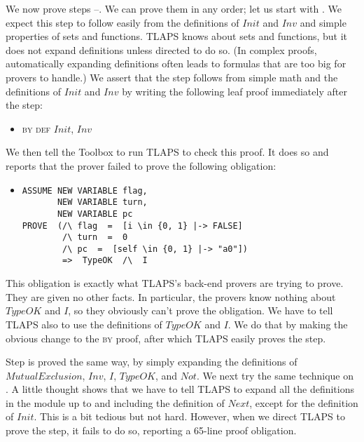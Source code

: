 \documentclass[a4paper]{llncs}
\makeatletter
\newcommand{\step}[2]{{\tlatex \@pfstepnum{#1}{#2}}}
\newenvironment{display}{\begin{itemize}\item[]}{\end{itemize}}
\makeatother
\begin{document}
We now prove steps \step{1}{1}--\step{1}{3}.  We can prove them in any
order; let us start with \step{1}{1}.  We expect this step to follow
easily from the definitions of $Init$ and $Inv$ and simple properties
of sets and functions.  TLAPS knows about sets and functions, but it
does not expand definitions unless directed to do so.  (In complex
proofs, automatically expanding definitions often leads to formulas
that are too big for provers to handle.)  We assert that the
step follows from simple math and the definitions of $Init$ and $Inv$
by writing the following leaf proof immediately after the step:
\begin{display}
\textsc{by def} $Init$, $Inv$
\end{display}
We then tell the Toolbox to run TLAPS to check this proof.  It does so
and reports that the prover failed to prove the following obligation:
\begin{display}
\small
\begin{verbatim}
ASSUME NEW VARIABLE flag,
       NEW VARIABLE turn,
       NEW VARIABLE pc
PROVE  (/\ flag  =  [i \in {0, 1} |-> FALSE]
        /\ turn  =  0
        /\ pc  =  [self \in {0, 1} |-> "a0"])
        =>  TypeOK  /\  I
\end{verbatim}
\end{display}
This obligation is exactly what TLAPS's back-end provers are trying to
prove.  They are given no other facts.  In particular, the
provers know nothing about $TypeOK$ and $I$, so they obviously can't
prove the obligation.  We have to tell TLAPS also to use the definitions
of $TypeOK$ and $I$.  We do that by making the obvious change to the
\textsc{by} proof, after which TLAPS easily proves the step.

Step \step{1}{3} is proved the same way, by simply expanding the
definitions of $MutualExclusion$, $Inv$, $I$, $TypeOK$, and $Not$.  We
next try the same technique on \step{1}{2}.  A little thought shows
that we have to tell TLAPS to expand all the definitions in the module
up to and including the definition of $Next$, except for the
definition of $Init$.  This is a bit tedious but not hard.  However,
when we direct TLAPS to prove the step, it fails to do so, reporting a
65-line proof obligation. 
\end{document}
